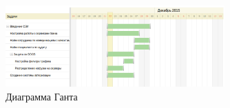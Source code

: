 \begin{figure}[h!]
\begin{center}
\includegraphics[width=0.75\textwidth]{GantDiag}
\caption{Диаграмма Ганта}
\end{center}
\label{fig:figure2}
\end{figure}
